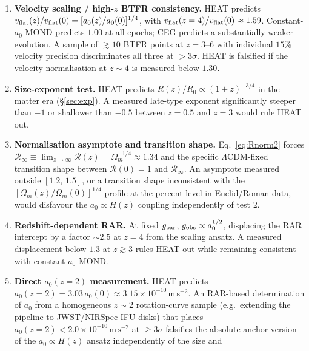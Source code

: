 \documentclass[twocolumn,letterpaper]{aastex631}
\newcommand{\azero}{a_0}
\newcommand{\lcdm}{\Lambda\mathrm{CDM}}
\begin{document}
\begin{enumerate}
  \item \textbf{Velocity scaling / high-$z$ BTFR consistency.}  HEAT
    predicts $v_{\rm flat}(z)/v_{\rm flat}(0)=[\azero(z)/\azero(0)]^{1/4}$,
    with $v_{\rm flat}(z=4)/v_{\rm flat}(0)\approx1.59$.
    Constant-$\azero$ MOND predicts $1.00$ at all epochs; CEG
    \citep{Hossenfelder2017,HossenfelderMistele2018} predicts
    a substantially weaker evolution.  A sample of
    $\gtrsim 10$ BTFR points at $z=3$--$6$ with individual
    $15\%$ velocity precision discriminates all three at
    $>3\sigma$.  HEAT is falsified if the velocity normalisation
    at $z\!\sim\!4$ is measured below $1.30$.
  \item \textbf{Size-exponent test.}  HEAT predicts
    $R(z)/R_{0}\propto(1+z)^{-3/4}$ in the matter era
    (\S\ref{sec:exp}).  A measured late-type exponent
    significantly steeper than $-1$ or shallower than
    $-0.5$ between $z=0.5$ and $z=3$ would rule HEAT out.
  \item \textbf{Normalisation asymptote and transition shape.}
    Eq.~\ref{eq:Rnorm2} forces
    $\mathcal{R}_{\infty}\equiv\lim_{z\to\infty}\mathcal{R}(z)=
    \Omega_{m}^{-1/4}\!\approx\!1.34$ and the specific
    $\lcdm$-fixed transition shape between
    $\mathcal{R}(0)=1$ and $\mathcal{R}_{\infty}$.  An
    asymptote measured outside $[1.2,\,1.5]$, or a transition
    shape inconsistent with the
    $[\Omega_{m}(z)/\Omega_{m}(0)]^{1/4}$ profile at the
    percent level in Euclid/Roman data, would disfavour the
    $\azero\propto H(z)$ coupling independently of test 2.
  \item \textbf{Redshift-dependent RAR.}  At fixed
    $g_{\rm bar}$, $g_{\rm obs}\propto\azero^{1/2}$, displacing
    the RAR intercept by a factor $\sim 2.5$ at $z=4$ from
    the scaling ansatz.  A measured displacement below
    $1.3$ at $z\gtrsim 3$ rules HEAT out while remaining
    consistent with constant-$\azero$ MOND.
  \item \textbf{Direct $\azero(z\!=\!2)$ measurement.}  HEAT
    predicts $\azero(z\!=\!2)\!=\!3.03\,\azero(0)\!\approx\!3.15\!
    \times\!10^{-10}\,\mathrm{m\,s^{-2}}$.  An RAR-based
    determination of $\azero$ from a homogeneous
    $z\!\sim\!2$ rotation-curve sample (e.g.\ extending the
    \citealt{Ciocan2026RAR} pipeline to JWST/NIRSpec IFU disks)
    that places $\azero(z\!=\!2)\!<\!2.0\!\times\!10^{-10}\,
    \mathrm{m\,s^{-2}}$ at $\geq 3\sigma$ falsifies the
    absolute-anchor version of the $\azero\propto H(z)$ ansatz
    independently of the size and

\end{enumerate}
\end{document}

